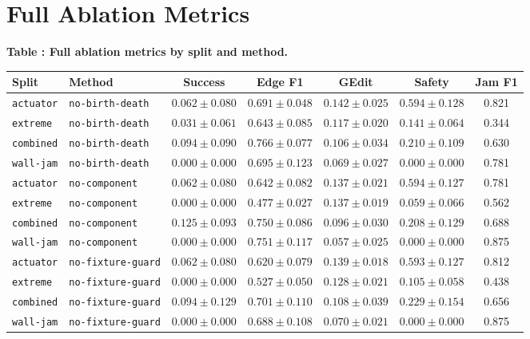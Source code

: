 \documentclass{article}
\begin{document}
\section{Full Ablation Metrics}
\tiny
\begin{center}
\label{tab:ablationfull}\textbf{Table \thetable: Full ablation metrics by split and method.}\\[0.4ex]
\begin{tabular}{llccccc}
\toprule
Split & Method & Success & Edge F1 & GEdit & Safety & Jam F1 \\
\midrule
\texttt{actuator} & \texttt{no-birth-death} & $0.062 \pm 0.080$ & $0.691 \pm 0.048$ & $0.142 \pm 0.025$ & $0.594 \pm 0.128$ & 0.821 \\
\texttt{extreme} & \texttt{no-birth-death} & $0.031 \pm 0.061$ & $0.643 \pm 0.085$ & $0.117 \pm 0.020$ & $0.141 \pm 0.064$ & 0.344 \\
\texttt{combined} & \texttt{no-birth-death} & $0.094 \pm 0.090$ & $0.766 \pm 0.077$ & $0.106 \pm 0.034$ & $0.210 \pm 0.109$ & 0.630 \\
\texttt{wall-jam} & \texttt{no-birth-death} & $0.000 \pm 0.000$ & $0.695 \pm 0.123$ & $0.069 \pm 0.027$ & $0.000 \pm 0.000$ & 0.781 \\
\texttt{actuator} & \texttt{no-component} & $0.062 \pm 0.080$ & $0.642 \pm 0.082$ & $0.137 \pm 0.021$ & $0.594 \pm 0.127$ & 0.781 \\
\texttt{extreme} & \texttt{no-component} & $0.000 \pm 0.000$ & $0.477 \pm 0.027$ & $0.137 \pm 0.019$ & $0.059 \pm 0.066$ & 0.562 \\
\texttt{combined} & \texttt{no-component} & $0.125 \pm 0.093$ & $0.750 \pm 0.086$ & $0.096 \pm 0.030$ & $0.208 \pm 0.129$ & 0.688 \\
\texttt{wall-jam} & \texttt{no-component} & $0.000 \pm 0.000$ & $0.751 \pm 0.117$ & $0.057 \pm 0.025$ & $0.000 \pm 0.000$ & 0.875 \\
\texttt{actuator} & \texttt{no-fixture-guard} & $0.062 \pm 0.080$ & $0.620 \pm 0.079$ & $0.139 \pm 0.018$ & $0.593 \pm 0.127$ & 0.812 \\
\texttt{extreme} & \texttt{no-fixture-guard} & $0.000 \pm 0.000$ & $0.527 \pm 0.050$ & $0.128 \pm 0.021$ & $0.105 \pm 0.058$ & 0.438 \\
\texttt{combined} & \texttt{no-fixture-guard} & $0.094 \pm 0.129$ & $0.701 \pm 0.110$ & $0.108 \pm 0.039$ & $0.229 \pm 0.154$ & 0.656 \\
\texttt{wall-jam} & \texttt{no-fixture-guard} & $0.000 \pm 0.000$ & $0.688 \pm 0.108$ & $0.070 \pm 0.021$ & $0.000 \pm 0.000$ & 0.875 \\

\end{tabular}
\end{center}
\end{document}
